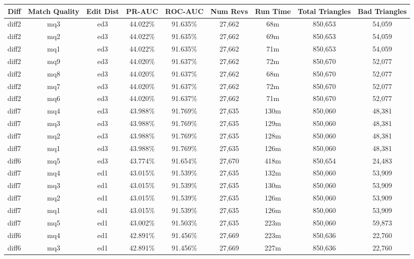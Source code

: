 \begin{sidewaystable}[!ph]
  \begin{center}
    \begin{tabular}{|c|c|c||c|c||c|c|c|c|}
\hline
Diff & Match Quality & Edit Dist
        & PR-AUC & ROC-AUC
        & Num Revs & Run Time
        & Total Triangles & Bad Triangles \\
\hline
\hline
diff2 & mq3 & ed3 & 44.022\% & 91.635\% & 27,662 & 68m & 850,653 & 54,059 \\
diff2 & mq2 & ed3 & 44.022\% & 91.635\% & 27,662 & 69m & 850,653 & 54,059 \\
diff2 & mq1 & ed3 & 44.022\% & 91.635\% & 27,662 & 71m & 850,653 & 54,059 \\
diff2 & mq9 & ed3 & 44.020\% & 91.637\% & 27,662 & 72m & 850,670 & 52,077 \\
diff2 & mq8 & ed3 & 44.020\% & 91.637\% & 27,662 & 68m & 850,670 & 52,077 \\
diff2 & mq7 & ed3 & 44.020\% & 91.637\% & 27,662 & 72m & 850,670 & 52,077 \\
diff2 & mq6 & ed3 & 44.020\% & 91.637\% & 27,662 & 71m & 850,670 & 52,077 \\
diff7 & mq4 & ed3 & 43.988\% & 91.769\% & 27,635 & 130m & 850,060 & 48,381 \\
diff7 & mq3 & ed3 & 43.988\% & 91.769\% & 27,635 & 129m & 850,060 & 48,381 \\
diff7 & mq2 & ed3 & 43.988\% & 91.769\% & 27,635 & 128m & 850,060 & 48,381 \\
diff7 & mq1 & ed3 & 43.988\% & 91.769\% & 27,635 & 126m & 850,060 & 48,381 \\
diff6 & mq5 & ed3 & 43.774\% & 91.654\% & 27,670 & 418m & 850,654 & 24,483 \\
diff7 & mq4 & ed1 & 43.015\% & 91.539\% & 27,635 & 132m & 850,060 & 53,909 \\
diff7 & mq3 & ed1 & 43.015\% & 91.539\% & 27,635 & 130m & 850,060 & 53,909 \\
diff7 & mq2 & ed1 & 43.015\% & 91.539\% & 27,635 & 126m & 850,060 & 53,909 \\
diff7 & mq1 & ed1 & 43.015\% & 91.539\% & 27,635 & 126m & 850,060 & 53,909 \\
diff7 & mq5 & ed1 & 43.002\% & 91.503\% & 27,635 & 223m & 850,060 & 59,873 \\
diff6 & mq4 & ed1 & 42.891\% & 91.456\% & 27,669 & 223m & 850,636 & 22,760 \\
diff6 & mq3 & ed1 & 42.891\% & 91.456\% & 27,669 & 227m & 850,636 & 22,760 \\

\end{tabular}
\end{center}
\end{sidewaystable}
